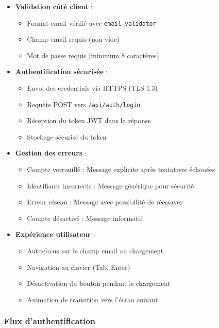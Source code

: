 \documentclass[a4paper,11pt]{report}
\begin{document}
\begin{itemize}
    \item \textbf{Validation côté client} :
    \begin{itemize}
        \item Format email vérifié avec \texttt{email\_validator}
        \item Champ email requis (non vide)
        \item Mot de passe requis (minimum 8 caractères)
    \end{itemize}
    
    \item \textbf{Authentification sécurisée} :
    \begin{itemize}
        \item Envoi des credentials via HTTPS (TLS 1.3)
        \item Requête POST vers \texttt{/api/auth/login}
        \item Réception du token JWT dans la réponse
        \item Stockage sécurisé du token
    \end{itemize}
    
    \item \textbf{Gestion des erreurs} :
    \begin{itemize}
        \item Compte verrouillé : Message explicite après tentatives échouées
        \item Identifiants incorrects : Message générique pour sécurité
        \item Erreur réseau : Message avec possibilité de réessayer
        \item Compte désactivé : Message informatif
    \end{itemize}
    
    \item \textbf{Expérience utilisateur} :
    \begin{itemize}
        \item Auto-focus sur le champ email au chargement
        \item Navigation au clavier (Tab, Enter)
        \item Désactivation du bouton pendant le chargement
        \item Animation de transition vers l'écran suivant
    \end{itemize}
\end{itemize}

\subsubsection{Flux d'authentification}
\end{document}
